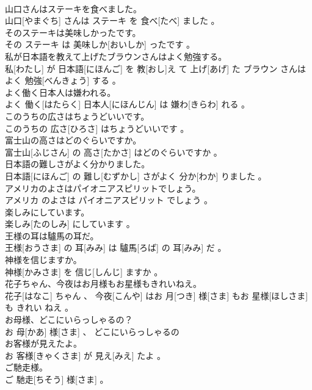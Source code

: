 \documentclass[8pt]{extreport}
\begin{document}
\begin{CJK}{UTF8}{min}
\\	山口さんはステーキを食べました。	
\\	山口[やまぐち] さんは ステーキ を 食べ[たべ] ました 。
\\	そのステーキは美味しかったです。	
\\	その ステーキ は 美味しか[おいしか] ったです 。
\\	私が日本語を教えて上げたブラウンさんはよく勉強する。	
\\	私[わたし] が 日本語[にほんご] を 教[おし]え て 上げ[あげ] た ブラウン さんはよく 勉強[べんきょう] する 。
\\	よく働く日本人は嫌われる。	
\\	よく 働く[はたらく] 日本人[にほんじん] は 嫌わ[きらわ] れる 。
\\	このうちの広さはちょうどいいです。	
\\	このうちの 広さ[ひろさ] はちょうどいいです 。
\\	富士山の高さはどのぐらいですか。	
\\	富士山[ふじさん] の 高さ[たかさ] はどのぐらいですか 。
\\	日本語の難しさがよく分かりました。	
\\	日本語[にほんご] の 難し[むずかし] さがよく 分か[わか] りました 。
\\	アメリカのよさはパイオニアスピリットでしょう。	
\\	アメリカ のよさは パイオニアスピリット でしょう 。
\\	楽しみにしています。	
\\	楽しみ[たのしみ] にしています 。
\\	王様の耳は驢馬の耳だ。	
\\	王様[おうさま] の 耳[みみ] は 驢馬[ろば] の 耳[みみ] だ 。
\\	神様を信じますか。	
\\	神様[かみさま] を 信じ[しんじ] ますか 。
\\	花子ちゃん、今夜はお月様もお星様もきれいねえ。	
\\	花子[はなこ] ちゃん 、 今夜[こんや] はお 月[つき] 様[さま] もお 星様[ほしさま] も きれい ねえ 。
\\	お母様、どこにいらっしゃるの？	
\\	お 母[かあ] 様[さま] 、 どこにいらっしゃるの 
\\	お客様が見えたよ。	
\\	お 客様[きゃくさま] が 見え[みえ] たよ 。
\\	ご馳走様。	
\\	ご 馳走[ちそう] 様[さま] 。

\end{CJK}
\end{document}
